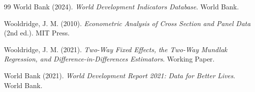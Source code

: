 \begin{thebibliography}{99}
World Bank (2024).
\textit{World Development Indicators Database}.
World Bank.

Wooldridge, J. M. (2010).
\textit{Econometric Analysis of Cross Section and Panel Data} (2nd ed.).
MIT Press.

Wooldridge, J. M. (2021).
\textit{Two-Way Fixed Effects, the Two-Way Mundlak Regression, and Difference-in-Differences Estimators}.
Working Paper.

World Bank (2021).
\textit{World Development Report 2021: Data for Better Lives}.
World Bank.

\end{thebibliography}
